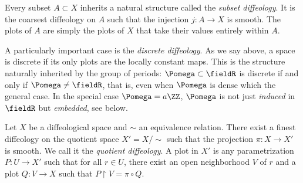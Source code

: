 \begin{article}
  Every subset $A \subset X$ inherits a natural structure called the \emph{subset diffeology}.
  It is the coarsest diffeology on $A$ such that the injection $j : A \to X$ is smooth.
  The plots of $A$ are simply the plots of $X$ that take their values entirely within $A$.
  
  A particularly important case is the \emph{discrete diffeology}.
  As we say above,
  a space is discrete if its only plots are the locally constant maps.
  This is the structure naturally inherited by the group of periods:
  $\Pomega \subset \fieldR$ is discrete if and only if $\Pomega \neq \fieldR$,
  that is,
  even when $\Pomega$ is dense which the general case.
  In the special case $\Pomega = a \ZZ$,
  $\Pomega$ is not just \emph{induced} in $\fieldR$ but \emph{embedded},
  see below.
\end{article}


\begin{article}
  Let $X$ be a diffeological space and $\sim$ an equivalence relation.
  There exist a finest diffeology on the quotient space $X' = X/\!\!\sim$ such that the projection $\pi : X \to X'$ is smooth.
  We call it the \emph{quotient diffeology}.
  A plot in $X'$ is any parametrization $P : U \to X'$ such that for all $r \in U$,
  there exist an open neighborhood $V$ of $r$ and a plot $Q : V \to X$ such that $P \restriction V = \pi \circ Q$.
\end{article}

